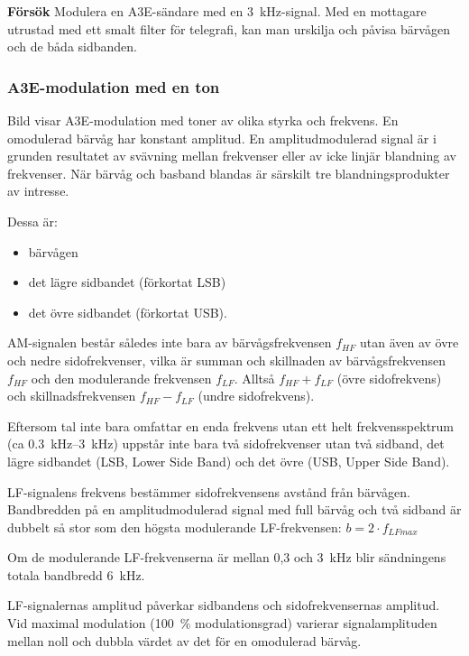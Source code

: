 \noindent\textbf{Försök}
%
Modulera en A3E-sändare med en \qty{3}{\kilo\hertz}-signal.
Med en mottagare utrustad med ett smalt filter för telegrafi, kan man urskilja
och påvisa bärvågen och de båda sidbanden.

\subsubsection{A3E-modulation med en ton}


Bild  visar A3E-modulation med toner av olika styrka och
frekvens.
En omodulerad bärvåg har konstant amplitud.
En amplitudmodulerad signal är i grunden resultatet av svävning mellan
frekvenser eller av icke linjär blandning av frekvenser.
När bärvåg och basband blandas är särskilt tre blandningsprodukter av
intresse.

Dessa är:
\begin{itemize}
\item bärvågen
\item det lägre sidbandet (förkortat LSB)
\item det övre sidbandet (förkortat USB).
\end{itemize}

AM-signalen består således inte bara av bärvågsfrekvensen \(f_{HF}\) utan även
av övre och nedre sidofrekvenser, vilka är summan och skillnaden av
bärvågsfrekvensen \(f_{HF}\) och den modulerande frekvensen \(f_{LF}\).
Alltså \(f_{HF} + f_{LF}\) (övre sidofrekvens) och skillnadsfrekvensen
\(f_{HF} - f_{LF}\) (undre sidofrekvens).

Eftersom tal inte bara omfattar en enda frekvens utan ett helt frekvensspektrum
(ca \SIrange{0,3}{3}{\kilo\hertz}) uppstår inte bara två sidofrekvenser utan två
sidband, det lägre sidbandet (LSB, Lower Side Band) och det övre (USB, Upper
Side Band).

LF-signalens frekvens bestämmer sidofrekvensens avstånd från bärvågen.
Bandbredden på en amplitudmodulerad signal med full bärvåg och två sidband är
dubbelt så stor som den högsta modulerande LF-frekvensen:
\(b= 2 \cdot f_{LFmax}\)

Om de modulerande LF-frekvenserna är mellan 0,3 och \qty{3}{\kilo\hertz} blir
sändningens totala bandbredd \qty{6}{\kilo\hertz}.

LF-signalernas amplitud påverkar sidbandens och sidofrekvensernas amplitud.
Vid maximal modulation (100~\% modulationsgrad) varierar signalamplituden mellan
noll och dubbla värdet av det för en omodulerad bärvåg.

